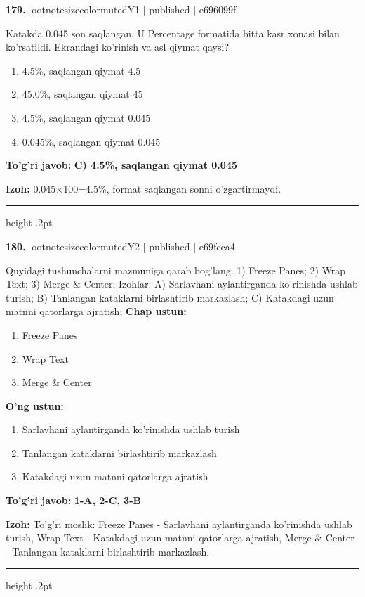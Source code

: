 \documentclass[10pt,a4paper]{article}
\begin{document}
\textbf{\color{ink}179.} {ootnotesizecolor{muted}Y1 | published | e696099f}
\par
Katakda 0.045 son saqlangan. U Percentage formatida bitta kasr xonasi bilan ko'rsatildi. Ekrandagi ko'rinish va asl qiymat qaysi?
\begin{enumerate}[label=\Alph*),leftmargin=9mm]
\item 4.5\%, saqlangan qiymat 4.5
\item 45.0\%, saqlangan qiymat 45
\item 4.5\%, saqlangan qiymat 0.045
\item 0.045\%, saqlangan qiymat 0.045
\end{enumerate}
\begin{tcolorbox}[enhanced,breakable,colback=teal!4,colframe=teal!55!black,boxrule=0.45pt,arc=1.2mm,left=2.8mm,right=2.8mm,top=2mm,bottom=2mm]
\textbf{\color{teal}To'g'ri javob:} \textbf{C) 4.5\%, saqlangan qiymat 0.045}
\par\smallskip
\textbf{Izoh:} 0.045\ensuremath{\times}100=4.5\%, format saqlangan sonni o'zgartirmaydi.
\end{tcolorbox}
\vspace{2mm}\hrule height .2pt\vspace{2mm}

\textbf{\color{ink}180.} {ootnotesizecolor{muted}Y2 | published | e69fcca4}
\par
Quyidagi tushunchalarni mazmuniga qarab bog'lang.  1) Freeze Panes;  2) Wrap Text;  3) Merge \& Center;  Izohlar: A) Sarlavhani aylantirganda ko'rinishda ushlab turish;  B) Tanlangan kataklarni birlashtirib markazlash;  C) Katakdagi uzun matnni qatorlarga ajratish;
\textbf{Chap ustun:}\begin{enumerate}[label=\arabic*),leftmargin=9mm]
\item Freeze Panes
\item Wrap Text
\item Merge \& Center
\end{enumerate}
\textbf{O'ng ustun:}\begin{enumerate}[label=\Alph*),leftmargin=9mm]
\item Sarlavhani aylantirganda ko'rinishda ushlab turish
\item Tanlangan kataklarni birlashtirib markazlash
\item Katakdagi uzun matnni qatorlarga ajratish
\end{enumerate}
\begin{tcolorbox}[enhanced,breakable,colback=teal!4,colframe=teal!55!black,boxrule=0.45pt,arc=1.2mm,left=2.8mm,right=2.8mm,top=2mm,bottom=2mm]
\textbf{\color{teal}To'g'ri javob:} \textbf{1-A, 2-C, 3-B}
\par\smallskip
\textbf{Izoh:} To'g'ri moslik: Freeze Panes - Sarlavhani aylantirganda ko'rinishda ushlab turish, Wrap Text - Katakdagi uzun matnni qatorlarga ajratish, Merge \& Center - Tanlangan kataklarni birlashtirib markazlash.
\end{tcolorbox}
\vspace{2mm}\hrule height .2pt\vspace{2mm}
\end{document}
